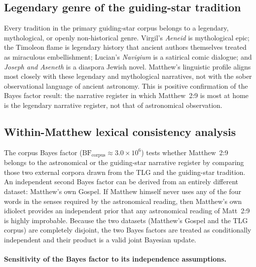 \documentclass[11pt,a4paper]{article}
\begin{document}
\subsection{Legendary genre of the guiding-star tradition}
\label{subsec:supp_genre}

Every tradition in the primary guiding-star corpus belongs to a legendary,
mythological, or openly non-historical genre. Virgil's \textit{Aeneid} is
mythological epic; the Timoleon flame is legendary history that ancient
authors themselves treated as miraculous embellishment; Lucian's
\textit{Navigium} is a satirical comic dialogue; and \textit{Joseph and Aseneth}
is a diaspora Jewish novel. Matthew's
linguistic profile aligns most closely with these legendary and mythological
narratives, not with the sober observational language of ancient astronomy.
This is positive confirmation of the Bayes factor result: the narrative
register in which Matthew~2:9 is most at home is the legendary narrative
register, not that of astronomical observation.

\subsection{Within-Matthew lexical consistency analysis}
\label{subsec:within_matthew}

The corpus Bayes factor ($\mathrm{BF}_\text{corpus} \approx 3.0\times10^{6}$) tests whether
Matthew~2:9 belongs to the astronomical or the guiding-star narrative register by
comparing those two external corpora drawn from the TLG and the guiding-star
tradition. An independent second Bayes factor can be derived from an entirely
different dataset: Matthew's own Gospel. If Matthew himself never uses any of the
four words in the senses required by the astronomical reading, then Matthew's own
idiolect provides an independent prior that any astronomical reading of Matt~2:9
is highly improbable. Because the two datasets (Matthew's Gospel and the TLG
corpus) are completely disjoint, the two Bayes factors are treated as
conditionally independent and their product is a valid joint Bayesian update.

\paragraph{Sensitivity of the Bayes factor to its independence assumptions.}
\end{document}
